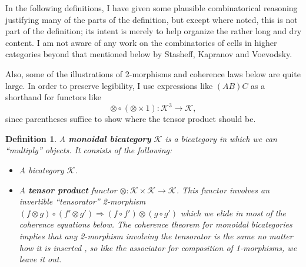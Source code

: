\documentclass[12pt,twoside,openright]{report}
\newtheorem{defn}{Definition}
\newcommand{\tensor}{\otimes}
\newcommand{\C}{ {\mathcal{K}}  }
\begin{document}
In the following definitions, I have given some plausible combinatorical reasoning justifying many of the parts of the definition, but except where noted, this is not part of the definition; its intent is merely to help organize the rather long and dry content.  I am not aware of any work on the combinatorics of cells in higher categories beyond that mentioned below by Stasheff, Kapranov and Voevodsky.  

Also, some of the illustrations of 2-morphisms and coherence laws below are quite large.  In order to preserve legibility, I use expressions like $(A B) C$ as a shorthand for functors like
      \[\tensor \circ (\tensor \times 1): \C^3 \to \C,\]
since parentheses suffice to show where the tensor product should be.

\begin{defn} A {\bf monoidal bicategory} $\C$ is a bicategory in which we can ``multiply'' objects.  It consists of the following: \\
  
\begin{itemize}
\item A bicategory $\C$.
\item A {\bf tensor product} functor $\otimes:\C \times \C \rightarrow \C$.  This functor involves an invertible ``tensorator'' 2-morphism $(f \otimes g) \circ (f' \otimes g') \Rightarrow (f \circ f') \otimes (g \circ g')$ which we elide in most of the coherence equations below.  The coherence theorem for monoidal bicategories implies that any 2-morphism involving the tensorator is the same no matter how it is inserted \cite[Remark~3.1.6]{Gurski}, so like the associator for composition of 1-morphisms, we leave it out.


\end{itemize}
\end{defn}
\end{document}
